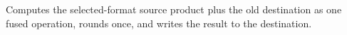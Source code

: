 Computes the selected-format source product plus the old destination as one fused operation, rounds once, and writes the result to the destination.
